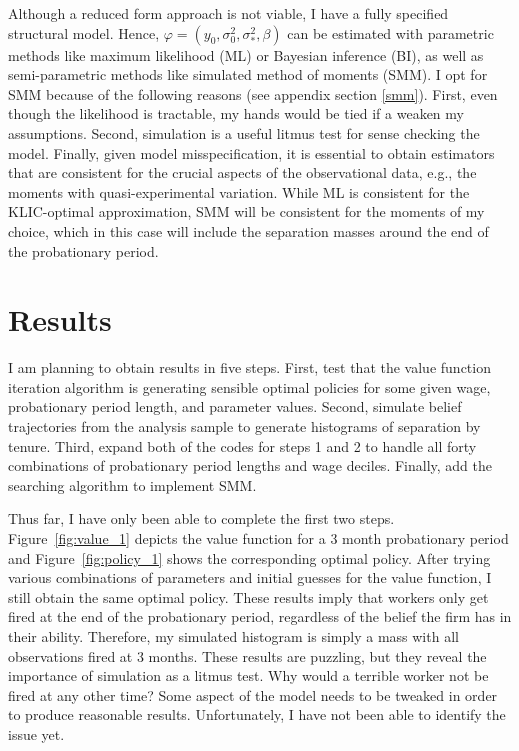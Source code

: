 \documentclass[12pt]{article}
\begin{document}
Although a reduced form approach is not viable, I have a fully specified structural model.
Hence, $\varphi=(y_0,\sigma_0^2,\sigma_*^2,\beta)$ can be estimated with parametric methods like maximum likelihood (ML) or Bayesian inference (BI), as well as semi-parametric methods like simulated method of moments (SMM).
I opt for SMM because of the following reasons (see appendix section \ref{smm}).
First, even though the likelihood is tractable, my hands would be tied if a weaken my assumptions.
Second, simulation is a useful litmus test for sense checking the model.
Finally, given model misspecification, it is essential to obtain estimators that are consistent for the crucial aspects of the observational data, e.g., the moments with quasi-experimental variation. 
While ML is consistent for the KLIC-optimal approximation, SMM will be consistent for the moments of my choice, which in this case will include the separation masses around the end of the probationary period.

\section{Results}

I am planning to obtain results in five steps.
First, test that the value function iteration algorithm is generating sensible optimal policies for some given wage, probationary period length, and parameter values.
Second, simulate belief trajectories from the analysis sample to generate histograms of separation by tenure.
Third, expand both of the codes for steps 1 and 2 to handle all forty combinations of probationary period lengths and wage deciles.
Finally, add the searching algorithm to implement SMM. 

Thus far, I have only been able to complete the first two steps.
Figure~\ref{fig:value_1} depicts the value function for a 3 month probationary period and Figure~\ref{fig:policy_1} shows the corresponding optimal policy.
After trying various combinations of parameters and initial guesses for the value function, I still obtain the same optimal policy.
These results imply that workers only get fired at the end of the probationary period, regardless of the belief the firm has in their ability.
Therefore, my simulated histogram is simply a mass with all observations fired at 3 months.
These results are puzzling, but they reveal the importance of simulation as a litmus test.
Why would a terrible worker not be fired at any other time?
Some aspect of the model needs to be tweaked in order to produce reasonable results.
Unfortunately, I have not been able to identify the issue yet.
\end{document}
